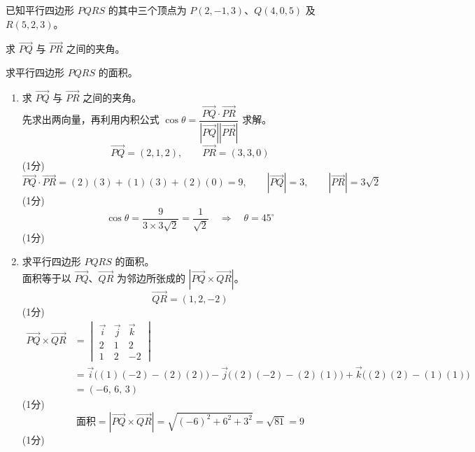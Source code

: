 \documentclass[12pt,a4paper]{exam-zh}
\newcommand{\qscoreoffset}{4em}
\newcommand{\qscore}[1]{%
    \leavevmode\unskip\nobreak\hfill
    \makebox[0pt][l]{\makebox[\qscoreoffset][r]{(#1\%)}}%
}
\begin{document}
\begin{question}[points = 6]
    已知平行四边形 $PQRS$ 的其中三个顶点为 $P(2,-1,3)$、$Q(4,0,5)$ 及 $R(5,2,3)$。

    \begin{questionparts}
        \item 求 $\overrightarrow{PQ}$ 与 $\overrightarrow{PR}$ 之间的夹角。 \qscore{3}

        \item 求平行四边形 $PQRS$ 的面积。 \qscore{3}
    \end{questionparts}
\end{question}

\begin{solution}
    \begin{enumerate}[label=(\alph*)]
        \item 求 $\overrightarrow{PQ}$ 与 $\overrightarrow{PR}$ 之间的夹角。 \\
        先求出两向量，再利用内积公式 $\cos\theta = \dfrac{\overrightarrow{PQ}\cdot\overrightarrow{PR}}{|\overrightarrow{PQ}||\overrightarrow{PR}|}$ 求解。 \\
        \[
            \overrightarrow{PQ} = (2,1,2), \qquad \overrightarrow{PR} = (3,3,0)
        \]
        \hfill (1分)
        \[
            \overrightarrow{PQ}\cdot\overrightarrow{PR} = (2)(3)+(1)(3)+(2)(0) = 9, \qquad |\overrightarrow{PQ}| = 3, \qquad |\overrightarrow{PR}| = 3\sqrt{2}
        \]
        \hfill (1分)
        \[
            \cos\theta = \frac{9}{3\times 3\sqrt{2}} = \frac{1}{\sqrt{2}} \quad\Rightarrow\quad \theta = 45^\circ
        \]
        \hfill (1分)

        \item 求平行四边形 $PQRS$ 的面积。 \\
        面积等于以 $\overrightarrow{PQ}$、$\overrightarrow{QR}$ 为邻边所张成的 $|\overrightarrow{PQ}\times\overrightarrow{QR}|$。 \\
        \[
            \overrightarrow{QR} = (1,2,-2)
        \]
        \hfill (1分)
        \begin{align*}
            \overrightarrow{PQ}\times\overrightarrow{QR}
            &= \begin{vmatrix} \vec{i} & \vec{j} & \vec{k} \\ 2 & 1 & 2 \\ 1 & 2 & -2 \end{vmatrix} \\
            &= \vec{i}\big((1)(-2)-(2)(2)\big) - \vec{j}\big((2)(-2)-(2)(1)\big) + \vec{k}\big((2)(2)-(1)(1)\big) \\
            &= (-6,\,6,\,3)
        \end{align*}
        \hfill (1分)
        \[
            \text{面积} = |\overrightarrow{PQ}\times\overrightarrow{QR}| = \sqrt{(-6)^2+6^2+3^2} = \sqrt{81} = 9
        \]
        \hfill (1分)
    \end{enumerate}
\end{solution}
\end{document}
